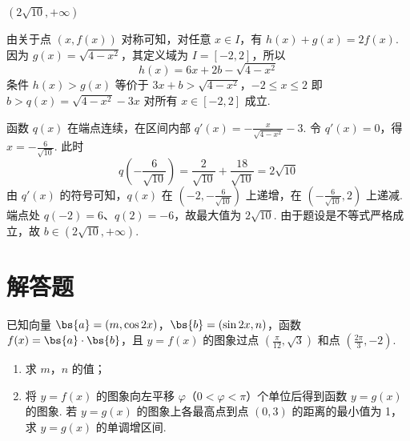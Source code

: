 \begin{answer}
\(\left(2\sqrt{10}, +\infty\right)\)
\end{answer}

\begin{solution}
由关于点 \((x,f(x))\) 对称可知，对任意 \(x\in I\)，有
\(h(x)+g(x)=2f(x)\). 因为 \(g(x)=\sqrt{4-x^2}\)，其定义域为 \(I=[-2,2]\)，所以
\[
h(x)=6x+2b-\sqrt{4-x^2}
\]
条件 \(h(x)>g(x)\) 等价于
\(3x+b>\sqrt{4-x^2}\)，\(-2\leqslant x\leqslant2\)
即 \(b>q(x)=\sqrt{4-x^2}-3x\) 对所有 \(x\in[-2,2]\) 成立.

函数 \(q(x)\) 在端点连续，在区间内部
\(q'(x)=-\frac{x}{\sqrt{4-x^2}}-3\). 令 \(q'(x)=0\)，得
\(x=-\frac6{\sqrt{10}}\). 此时
\[
q\left(-\frac6{\sqrt{10}}\right)
=\frac2{\sqrt{10}}+\frac{18}{\sqrt{10}}=2\sqrt{10}
\]
由 \(q'(x)\) 的符号可知，\(q(x)\) 在 \(\left(-2,-\frac6{\sqrt{10}}\right)\) 上递增，在 \(\left(-\frac6{\sqrt{10}},2\right)\) 上递减. 端点处 \(q(-2)=6\)、\(q(2)=-6\)，故最大值为 \(2\sqrt{10}\). 由于题设是不等式严格成立，故
\(b\in(2\sqrt{10},+\infty)\).
\end{solution}

\section{解答题}

\begin{problem}
已知向量 \( \bs{a} = (m, \cos 2x) \)，\( \bs{b} = (\sin 2x, n) \)，函数 \( f(x) = \bs{a} \cdot \bs{b} \)，且 \( y = f(x) \) 的图象过点 \(\left(\frac{\pi}{12}, \sqrt{3}\right)\) 和点 \(\left(\frac{2\pi}{3}, -2\right)\).

\begin{enumerate}
\item 求 \(m\)，\(n\) 的值；
\item 将 \( y = f(x) \) 的图象向左平移 \(\varphi\)（\(0 < \varphi < \pi\)）个单位后得到函数 \( y = g(x) \) 的图象. 若 \( y = g(x) \) 的图象上各最高点到点 \((0,3)\) 的距离的最小值为 1，求 \( y = g(x) \) 的单调增区间.
\end{enumerate}
\end{problem}

